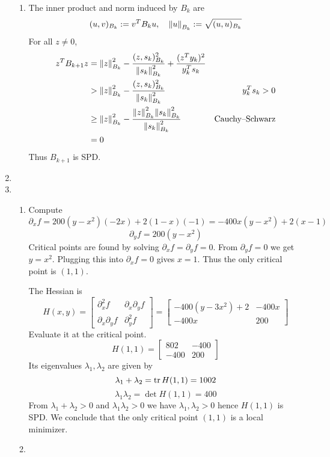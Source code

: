 \documentclass{article}
\newcommand{\m}[2][b]{\begin{#1matrix}#2\end{#1matrix}}
\renewcommand{\d}{\partial}
\renewcommand{\l}{\lambda}
\begin{document}
\begin{enumerate}
\begin{enumerate}
		
		
		\item The inner product and norm induced by $B_k$ are
		\[(u,v)_{B_k} := v^TB_ku,
		\quad \norm{u}_{B_k} := \sqrt{(u,u)_{B_k}}\]
		For all $z\ne0$,
		\begin{align*}
			z^TB_{k+1}z &= \norm{z}_{B_k}^2 - \frac{(z,s_k)_{B_k}^2}{\norm{s_k}_{B_k}^2} + \frac{(z^Ty_k)^2}{y_k^Ts_k} \\
			&> \norm{z}_{B_k}^2 - \frac{(z,s_k)_{B_k}^2}{\norm{s_k}_{B_k}^2} & y_k^Ts_k > 0 \\
			&\ge \norm{z}_{B_k}^2 - \frac{\norm{z}_{B_k}^2\norm{s_k}_{B_k}^2}{\norm{s_k}_{B_k}^2} & \text{Cauchy--Schwarz} \\
			&= 0
		\end{align*}
		Thus $B_{k+1}$ is SPD.
		
		
		
	\end{enumerate}



	\pagebreak
	
	
	
	\item
	
	
	
	\pagebreak
	
	
	
	\item
	
	\begin{enumerate}
		
		
		
		
		\item Compute
		\[\d_xf = 200(y-x^2)(-2x) + 2(1-x)(-1) = -400x(y-x^2) + 2(x-1)\]
		\[\d_yf = 200(y-x^2)\]
		Critical points are found by solving $\d_xf=\d_yf=0$. From $\d_yf=0$ we get $y=x^2$. Plugging this into $\d_xf=0$ gives $x=1$. Thus the only critical point is $(1,1)$.
		
		The Hessian is
		\[H(x,y) = \m{\d_x^2f & \d_x\d_yf \\ \d_x\d_yf & \d_y^2f} = \m{-400(y-3x^2)+2 & -400x \\ -400x & 200}\]
		Evaluate it at the critical point.
		\[H(1,1) = \m{802 & -400 \\ -400 & 200}\]
		Its eigenvalues $\l_1,\l_2$ are given by
		\[\l_1+\l_2 = \tr H(1,1) = 1002\]
		\[\l_1\l_2 = \det H(1,1) = 400\]
		From $\l_1+\l_2>0$ and $\l_1\l_2>0$ we have $\l_1,\l_2>0$ hence $H(1,1)$ is SPD. We conclude that the only critical point $(1,1)$ is a local minimizer.
		 
		
		
		\item
		
		
		
		
	\end{enumerate}
	
	
	
\end{enumerate}
	
	
	
\end{document}

